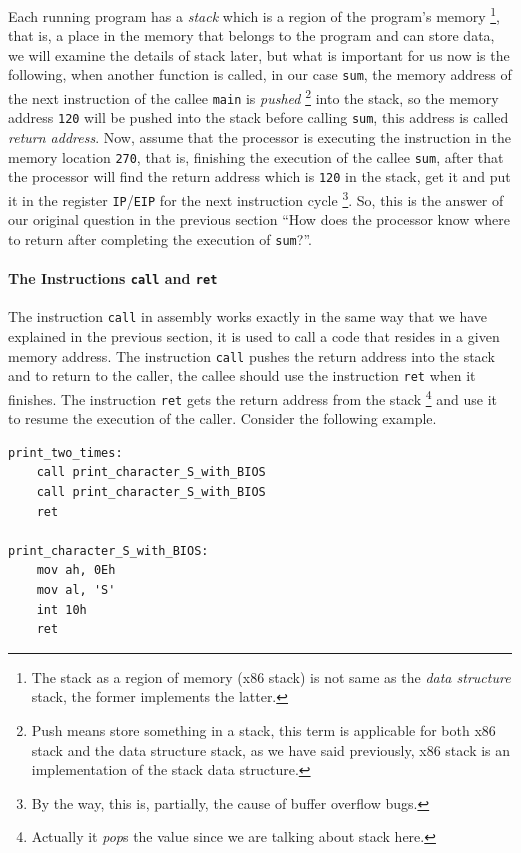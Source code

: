 Each running program has a \emph{stack} which is a region of the
program's memory \footnote{The stack as a region of memory (x86 stack)
  is not same as the \emph{data structure} stack, the former implements
  the latter.}, that is, a place in the memory that belongs to the
program and can store data, we will examine the details of stack later,
but what is important for us now is the following, when another function
is called, in our case \lstinline!sum!, the memory address of the next
instruction of the callee \lstinline!main! is \emph{pushed} \footnote{Push
  means store something in a stack, this term is applicable for both x86
  stack and the data structure stack, as we have said previously, x86
  stack is an implementation of the stack data structure.} into the
stack, so the memory address \lstinline!120! will be pushed into the
stack before calling \lstinline!sum!, this address is called
\emph{return address}. Now, assume that the processor is executing the
instruction in the memory location \lstinline!270!, that is, finishing
the execution of the callee \lstinline!sum!, after that the processor
will find the return address which is \lstinline!120! in the stack, get
it and put it in the register \lstinline!IP!/\lstinline!EIP! for the
next instruction cycle \footnote{By the way, this is, partially, the
  cause of buffer overflow bugs.}. So, this is the answer of our
original question in the previous section ``How does the processor know
where to return after completing the execution of \lstinline!sum!?''.

\paragraph{\texorpdfstring{The Instructions \texttt{call} and
\texttt{ret}}{The Instructions call and ret}}\label{the-instructions-call-and-ret}

The instruction \lstinline!call! in assembly works exactly in the same
way that we have explained in the previous section, it is used to call a
code that resides in a given memory address. The instruction
\lstinline!call! pushes the return address into the stack and to return
to the caller, the callee should use the instruction \lstinline!ret!
when it finishes. The instruction \lstinline!ret! gets the return
address from the stack \footnote{Actually it \emph{pop}s the value since
  we are talking about stack here.} and use it to resume the execution
of the caller. Consider the following example.

\begin{lstlisting}
print_two_times:
    call print_character_S_with_BIOS
    call print_character_S_with_BIOS
    ret

print_character_S_with_BIOS:
    mov ah, 0Eh
    mov al, 'S'
    int 10h
    ret
\end{lstlisting}

